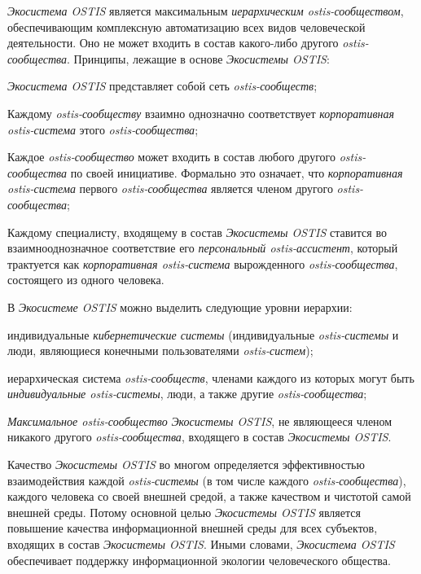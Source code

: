 \textit{Экосистема OSTIS} является максимальным \textit{иерархическим ostis-сообществом}, обеспечивающим комплексную автоматизацию всех видов человеческой деятельности. 
Оно не может входить в состав какого-либо другого \textit{ostis-сообщества}. 
Принципы, лежащие в основе \textit{Экосистемы OSTIS}:
\begin{textitemize}
    \item \textit{Экосистема OSTIS} представляет собой сеть \textit{ostis-сообществ};
    \item Каждому \textit{ostis-сообществу} взаимно однозначно соответствует \textit{корпоративная ostis-система} этого \textit{ostis-сообщества};
    \item Каждое \textit{ostis-сообщество} может входить в состав любого другого \textit{ostis-сообщества} по своей инициативе. Формально это означает, что \textit{корпоративная ostis-система} первого \textit{ostis-сообщества} является членом другого \textit{ostis-сообщества};
    \item Каждому специалисту, входящему в состав \textit{Экосистемы OSTIS} ставится во взаимнооднозначное соответствие его \textit{персональный ostis-ассистент}, который трактуется как \textit{корпоративная ostis-система} вырожденного \textit{ostis-сообщества}, состоящего из одного человека.
\end{textitemize}

В \textit{Экосистеме OSTIS} можно выделить следующие уровни иерархии:
\begin{textitemize}
    \item индивидуальные \textit{кибернетические системы} (индивидуальные \textit{ostis-системы} и люди, являющиеся конечными пользователями \textit{ostis-систем});
    \item иерархическая система \textit{ostis-сообществ}, членами каждого из которых могут быть \textit{индивидуальные ostis-системы}, люди, а также другие \textit{ostis-сообщества};
    \item \textit{Максимальное ostis-сообщество} \textit{Экосистемы OSTIS}, не являющееся членом никакого другого \textit{ostis-сообщества}, входящего в состав \textit{Экосистемы OSTIS}.
\end{textitemize}

Качество \textit{Экосистемы OSTIS} во многом определяется эффективностью взаимодействия каждой \textit{ostis-системы} (в том числе каждого \textit{ostis-сообщества}), каждого человека со своей внешней средой, а также качеством и чистотой самой внешней среды. 
Потому основной целью \textit{Экосистемы OSTIS} является повышение качества информационной внешней среды для всех субъектов, входящих в состав \textit{Экосистемы OSTIS}.
Иными словами, \textit{Экосистема OSTIS} обеспечивает поддержку информационной экологии человеческого общества.

